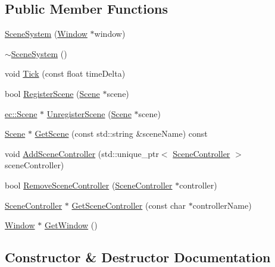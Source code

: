 \subsection*{Public Member Functions}
\begin{DoxyCompactItemize}
\item 
\mbox{\hyperlink{classec_1_1_scene_system_aa5a44baf7e80b2d7d0d96a84847bf2b6}{Scene\+System}} (\mbox{\hyperlink{classec_1_1_window}{Window}} $\ast$window)
\item 
\mbox{\hyperlink{classec_1_1_scene_system_a612e6cc45dbea62c7ffa4c752f965482}{$\sim$\+Scene\+System}} ()
\item 
void \mbox{\hyperlink{classec_1_1_scene_system_adc8c9d0d3a83ce48e5bd177613ef9081}{Tick}} (const float time\+Delta)
\item 
bool \mbox{\hyperlink{classec_1_1_scene_system_a039bbde3973021e05d7581b96739639c}{Register\+Scene}} (\mbox{\hyperlink{classec_1_1_scene}{Scene}} $\ast$scene)
\item 
\mbox{\hyperlink{classec_1_1_scene}{ec\+::\+Scene}} $\ast$ \mbox{\hyperlink{classec_1_1_scene_system_ab3b1d99cc1eff3c7a140be71b5164954}{Unregister\+Scene}} (\mbox{\hyperlink{classec_1_1_scene}{Scene}} $\ast$scene)
\item 
\mbox{\hyperlink{classec_1_1_scene}{Scene}} $\ast$ \mbox{\hyperlink{classec_1_1_scene_system_a94cdf226415c276098032857b36ecc95}{Get\+Scene}} (const std\+::string \&scene\+Name) const
\item 
void \mbox{\hyperlink{classec_1_1_scene_system_abd2b67cb6b5378370e43719b8703e6b4}{Add\+Scene\+Controller}} (std\+::unique\+\_\+ptr$<$ \mbox{\hyperlink{classec_1_1_scene_controller}{Scene\+Controller}} $>$ scene\+Controller)
\item 
bool \mbox{\hyperlink{classec_1_1_scene_system_ac00ca66da860a434e57a41337e16efdf}{Remove\+Scene\+Controller}} (\mbox{\hyperlink{classec_1_1_scene_controller}{Scene\+Controller}} $\ast$controller)
\item 
\mbox{\hyperlink{classec_1_1_scene_controller}{Scene\+Controller}} $\ast$ \mbox{\hyperlink{classec_1_1_scene_system_a18f7a94cb7336f6a7ded7501ece69326}{Get\+Scene\+Controller}} (const char $\ast$controller\+Name)
\item 
\mbox{\hyperlink{classec_1_1_window}{Window}} $\ast$ \mbox{\hyperlink{classec_1_1_scene_system_a590db7786f2ec3c7951f06c5d5d2e664}{Get\+Window}} ()
\end{DoxyCompactItemize}


\subsection{Constructor \& Destructor Documentation}
\mbox{\label{classec_1_1_scene_system_aa5a44baf7e80b2d7d0d96a84847bf2b6}} 
